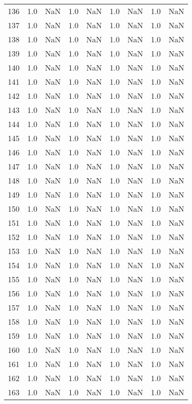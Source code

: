 \begin{tabular}{lrrrrrrrr}
136 & 1.0 & NaN & 1.0 & NaN & 1.0 & NaN & 1.0 & NaN \\
137 & 1.0 & NaN & 1.0 & NaN & 1.0 & NaN & 1.0 & NaN \\
138 & 1.0 & NaN & 1.0 & NaN & 1.0 & NaN & 1.0 & NaN \\
139 & 1.0 & NaN & 1.0 & NaN & 1.0 & NaN & 1.0 & NaN \\
140 & 1.0 & NaN & 1.0 & NaN & 1.0 & NaN & 1.0 & NaN \\
141 & 1.0 & NaN & 1.0 & NaN & 1.0 & NaN & 1.0 & NaN \\
142 & 1.0 & NaN & 1.0 & NaN & 1.0 & NaN & 1.0 & NaN \\
143 & 1.0 & NaN & 1.0 & NaN & 1.0 & NaN & 1.0 & NaN \\
144 & 1.0 & NaN & 1.0 & NaN & 1.0 & NaN & 1.0 & NaN \\
145 & 1.0 & NaN & 1.0 & NaN & 1.0 & NaN & 1.0 & NaN \\
146 & 1.0 & NaN & 1.0 & NaN & 1.0 & NaN & 1.0 & NaN \\
147 & 1.0 & NaN & 1.0 & NaN & 1.0 & NaN & 1.0 & NaN \\
148 & 1.0 & NaN & 1.0 & NaN & 1.0 & NaN & 1.0 & NaN \\
149 & 1.0 & NaN & 1.0 & NaN & 1.0 & NaN & 1.0 & NaN \\
150 & 1.0 & NaN & 1.0 & NaN & 1.0 & NaN & 1.0 & NaN \\
151 & 1.0 & NaN & 1.0 & NaN & 1.0 & NaN & 1.0 & NaN \\
152 & 1.0 & NaN & 1.0 & NaN & 1.0 & NaN & 1.0 & NaN \\
153 & 1.0 & NaN & 1.0 & NaN & 1.0 & NaN & 1.0 & NaN \\
154 & 1.0 & NaN & 1.0 & NaN & 1.0 & NaN & 1.0 & NaN \\
155 & 1.0 & NaN & 1.0 & NaN & 1.0 & NaN & 1.0 & NaN \\
156 & 1.0 & NaN & 1.0 & NaN & 1.0 & NaN & 1.0 & NaN \\
157 & 1.0 & NaN & 1.0 & NaN & 1.0 & NaN & 1.0 & NaN \\
158 & 1.0 & NaN & 1.0 & NaN & 1.0 & NaN & 1.0 & NaN \\
159 & 1.0 & NaN & 1.0 & NaN & 1.0 & NaN & 1.0 & NaN \\
160 & 1.0 & NaN & 1.0 & NaN & 1.0 & NaN & 1.0 & NaN \\
161 & 1.0 & NaN & 1.0 & NaN & 1.0 & NaN & 1.0 & NaN \\
162 & 1.0 & NaN & 1.0 & NaN & 1.0 & NaN & 1.0 & NaN \\
163 & 1.0 & NaN & 1.0 & NaN & 1.0 & NaN & 1.0 & NaN \\

\end{tabular}
